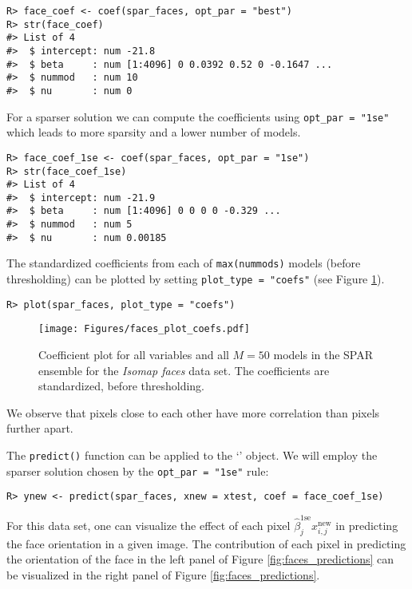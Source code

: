 \documentclass[
  article,
  nojss]{jss}
\newcommand{\class}[1]{`\code{#1}'}
\begin{document}
\begin{verbatim}
R> face_coef <- coef(spar_faces, opt_par = "best")
R> str(face_coef)
#> List of 4
#>  $ intercept: num -21.8
#>  $ beta     : num [1:4096] 0 0.0392 0.52 0 -0.1647 ...
#>  $ nummod   : num 10
#>  $ nu       : num 0
\end{verbatim}

For a sparser solution we can compute the coefficients using
\texttt{opt\_par\ =\ "1se"} which leads to more sparsity and a lower
number of models.

\begin{verbatim}
R> face_coef_1se <- coef(spar_faces, opt_par = "1se")
R> str(face_coef_1se)
#> List of 4
#>  $ intercept: num -21.9
#>  $ beta     : num [1:4096] 0 0 0 0 -0.329 ...
#>  $ nummod   : num 5
#>  $ nu       : num 0.00185
\end{verbatim}

The standardized coefficients from each of \texttt{max(nummods)} models
(before thresholding) can be plotted by setting
\texttt{plot\_type\ =\ "coefs"} (see Figure \ref{fig:faces_coefs}).

\begin{verbatim}
R> plot(spar_faces, plot_type = "coefs")
\end{verbatim}

\begin{figure}[t!]
\centering
\texttt{[image: Figures/faces\_plot\_coefs.pdf]}
\caption{Coefficient plot for all variables and all $M=50$ models in the SPAR ensemble for the \emph{Isomap faces} data set. The coefficients are standardized, before thresholding.
\label{fig:faces_coefs}}
\end{figure}

We observe that pixels close to each other have more correlation than
pixels further apart.

The \texttt{predict()} function can be applied to the \class{spar.cv}
object. We will employ the sparser solution chosen by the
\texttt{opt\_par\ =\ "1se"} rule:

\begin{verbatim}
R> ynew <- predict(spar_faces, xnew = xtest, coef = face_coef_1se)
\end{verbatim}

For this data set, one can visualize the effect of each pixel
\(\hat\beta^\text{1se}_j x^\text{new}_{i,j}\) in predicting the face
orientation in a given image. The contribution of each pixel in
predicting the orientation of the face in the left panel of Figure
\ref{fig:faces_predictions} can be visualized in the right panel of
Figure \ref{fig:faces_predictions}.
\end{document}
